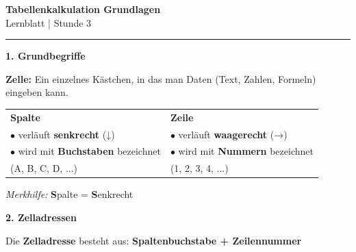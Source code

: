 \documentclass[11pt, a4paper]{article}
\begin{document}
\begin{center}
    {\Large\bfseries\textcolor{fachfarbe}{Tabellenkalkulation Grundlagen}}\\[0.3em]
    {\small Lernblatt | Stunde 3}
\end{center}
\vspace{-0.3em}
\hrule
\vspace{0.8em}


\textbf{\textcolor{fachfarbe}{1. Grundbegriffe}}

\begin{merkkasten}
\textbf{Zelle:} Ein einzelnes Kästchen, in das man Daten (Text, Zahlen, Formeln) eingeben kann.
\end{merkkasten}

\begin{tabular}{@{}p{7cm}p{7cm}@{}}
\textbf{Spalte} & \textbf{Zeile} \\
$\bullet$ verläuft \textbf{senkrecht} (↓) & $\bullet$ verläuft \textbf{waagerecht} (→) \\
$\bullet$ wird mit \textbf{Buchstaben} bezeichnet & $\bullet$ wird mit \textbf{Nummern} bezeichnet \\
\hspace{0.5em} (A, B, C, D, ...) & \hspace{0.5em} (1, 2, 3, 4, ...)
\end{tabular}

\vspace{0.3em}
\textit{Merkhilfe:} \textbf{S}palte = \textbf{S}enkrecht

\vspace{0.5em}


\textbf{\textcolor{fachfarbe}{2. Zelladressen}}

\begin{merkkasten}
Die \textbf{Zelladresse} besteht aus: \textbf{Spaltenbuchstabe + Zeilennummer}
\end{merkkasten}
\end{document}
